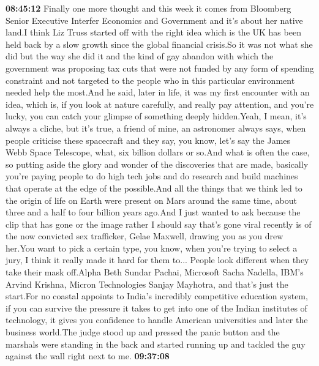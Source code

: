 \documentclass{article}%
\begin{document}
\textbf{08:45:12}%
\newline%
Finally one more thought and this week it comes from Bloomberg Senior Executive Interfer Economics and Government and it's about her native land.I think Liz Truss started off with the right idea which is the UK has been held back by a slow growth since the global financial crisis.So it was not what she did but the way she did it and the kind of gay abandon with which the government was proposing tax cuts that were not funded by any form of spending constraint and not targeted to the people who in this particular environment needed help the most.And he said, later in life, it was my first encounter with an idea, which is, if you look at nature carefully, and really pay attention, and you're lucky, you can catch your glimpse of something deeply hidden.Yeah, I mean, it's always a cliche, but it's true, a friend of mine, an astronomer always says, when people criticise these spacecraft and they say, you know, let's say the James Webb Space Telescope, what, six billion dollars or so.And what is often the case, so putting aside the glory and wonder of the discoveries that are made, basically you're paying people to do high tech jobs and do research and build machines that operate at the edge of the possible.And all the things that we think led to the origin of life on Earth were present on Mars around the same time, about three and a half to four billion years ago.And I just wanted to ask because the clip that has gone or the image rather I should say that's gone viral recently is of the now convicted sex trafficker, Gelae Maxwell, drawing you as you drew her.You want to pick a certain type, you know, when you're trying to select a jury, I think it really made it hard for them to... People look different when they take their mask off.Alpha Beth Sundar Pachai, Microsoft Sacha Nadella, IBM's Arvind Krishna, Micron Technologies Sanjay Mayhotra, and that's just the start.For no coastal appoints to India's incredibly competitive education system, if you can survive the pressure it takes to get into one of the Indian institutes of technology, it gives you confidence to handle American universities and later the business world.The judge stood up and pressed the panic button and the marshals were standing in the back and started running up and tackled the guy against the wall right next to me.%
\textbf{09:37:08}%
\newline%
\end{document}
